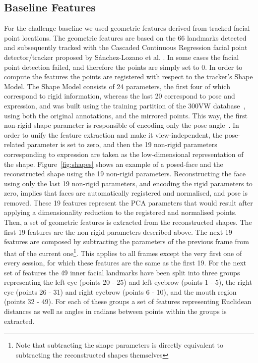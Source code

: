 \documentclass[a4paper, 10pt, conference]{ieeeconf}      \usepackage{FG2017}
\begin{document}
\subsection{Baseline Features}
\noindent For the challenge baseline we used geometric features derived from tracked facial point locations. The geometric features are based on the 66 landmarks detected and subsequently tracked with the Cascaded Continuous Regression facial point detector/tracker proposed by S\'anchez-Lozano et al. \cite{Sanchez16ECCV,Sanchez16arXiv}. In some cases the facial point detection failed, and therefore the points are simply set to 0. In order to compute the features the points are registered with respect to the tracker's Shape Model. The Shape Model consists of 24 parameters, the first four of which correspond to rigid information, whereas the last 20 correspond to pose and expression, and was built using the training partition of the 300VW database~\cite{shen15}, using both the original annotations, and the mirrored points. This way, the first non-rigid shape parameter is responsible of encoding only the pose angle~\cite{gonzalez07}. In order to unify the feature extraction and make it view-independent, the pose-related parameter is set to zero, and then the 19 non-rigid parameters corresponding to expression are taken as the low-dimensional representation of the shape. 
Figure~\ref{fig:shapes} shows an example of a posed-face and the reconstructed shape using the 19 non-rigid parameters. Reconstructing the face using only the last 19 non-rigid parameters, and encoding the rigid parameters to zero, implies that faces are automatically registered and normalised, and pose is removed. These 19 features represent the PCA parameters that would result after applying a dimensionality reduction to the registered and normalised points. 
Then, a set of geometric features is extracted from the reconstructed shapes. The first 19 features are the non-rigid parameters described above. The next 19 features are composed by subtracting the parameters of the previous frame from that of the current one\footnote{Note that subtracting the shape parameters is directly equivalent to subtracting the reconstructed shapes themselves}. This applies to all frames except the very first one of every session, for which these features are the same as the first 19. 
For the next set of features the 49 inner facial landmarks have been split into three groups representing the left eye (points 20 - 25) and left eyebrow (points 1 - 5), the right eye (points 26 - 31) and right eyebrow (points 6 - 10), and the mouth region (points 32 - 49). For each of these groups a set of features representing Euclidean distances as well as angles in radians between points within the groups is extracted.
\end{document}
